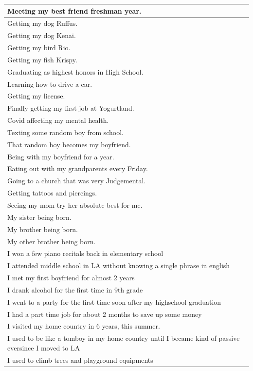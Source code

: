 \documentclass[
  .7em,
  letterpaper,
  DIV=11,
  numbers=noendperiod]{scrartcl}
\begin{document}
\begin{table}
\begin{tabular}{l}
\hline
Meeting my best friend freshman year.\\
\hline
Getting my dog Ruffus.\\
\hline
Getting my dog Kenai.\\
\hline
Getting my bird Rio.\\
\hline
Getting my fish Krispy.\\
\hline
Graduating as highest honors in High School.\\
\hline
Learning how to drive a car.\\
\hline
Getting my license.\\
\hline
Finally getting my first job at Yogurtland.\\
\hline
Covid affecting my mental health.\\
\hline
Texting some random boy from school.\\
\hline
That random boy becomes my boyfriend.\\
\hline
Being with my boyfriend for a year.\\
\hline
Eating out with my grandparents every Friday.\\
\hline
Going to a church that was very Judgemental.\\
\hline
Getting tattoos and piercings.\\
\hline
Seeing my mom try her absolute best for me.\\
\hline
My sister being born.\\
\hline
My brother being born.\\
\hline
My other brother being born.\\
\hline
I won a few piano recitals back in elementary school\\
\hline
I attended middle school in LA without knowing a single phrase in english\\
\hline
I met my first boyfriend for almost 2 years\\
\hline
I drank alcohol for the first time in 9th grade\\
\hline
I went to a party for the first time soon after my highschool graduation\\
\hline
I had a part time job for about 2 months to save up some money\\
\hline
I visited my home country in 6 years, this summer.\\
\hline
I used to be like a tomboy in my home country until I became kind of passive eversince I moved to LA\\
\hline
I used to climb trees and playground equipments\\

\end{tabular}
\end{table}
\end{document}
